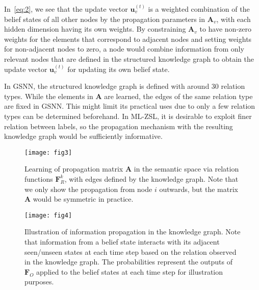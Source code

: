 \documentclass[10pt,twocolumn,letterpaper]{article}
\begin{document}
In~\eqref{eq:2}, we see that the update vector $\mathbf{u}_v^{(t)}$ is a weighted combination of the belief states of all other nodes by the propagation parameters in $\mathbf{A}_v$, with each hidden dimension having its own weights.
By constraining $\mathbf{A}_v$ to have non-zero weights for the elements that correspond to adjacent nodes and setting weights for non-adjacent nodes to zero, a node would combine information from only relevant nodes that are defined in the structured knowledge graph to obtain the update vector $\mathbf{u}_v^{(t)}$ for updating its own belief state.

In GSNN, the structured knowledge graph is defined with around 30 relation types. While the elements in $\mathbf{A}$ are learned, the edges of the same relation type are fixed in GSNN. This might limit its practical uses due to only a few relation types can be determined beforehand. In ML-ZSL, it is desirable to exploit finer relation between labels, so the propagation mechanism with the resulting knowledge graph would be sufficiently informative.

\begin{figure}[t]
    \texttt{[image: fig3]}
    \caption{Learning of propagation matrix $\mathbf{A}$ in the semantic space via relation functions $\mathbf{F}^k_R$, with edges defined by the knowledge graph. Note that we only show the propagation from node $i$ outwards, but the matrix $\mathbf{A}$ would be symmetric in practice.}
    \label{fig:fig3}
\end{figure}\begin{figure*}[t]
\texttt{[image: fig4]}
\caption{Illustration of information propagation in the knowledge graph. Note that information from a belief state interacts with its adjacent seen/unseen states at each time step based on the relation observed in the knowledge graph. The probabilities represent the outputs of $\mathbf{F}_O$ applied to the belief states at each time step for illustration purposes.}
\label{fig:fig4}
\end{figure*}
\end{document}
